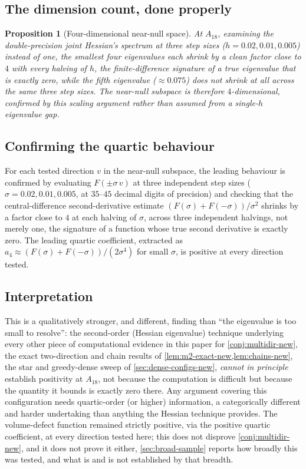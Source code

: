 \documentclass[11pt,reqno]{amsart}
\renewcommand{\_}{\origunderscore\allowbreak}
\numberwithin{equation}{section}
\theoremstyle{plain}
\newtheorem{prop}[thm]{Proposition}
\theoremstyle{definition}
\theoremstyle{remark}
\begin{document}
\subsection{The dimension count, done properly}\label{sec:dim-count-new}

\begin{prop}[Four-dimensional near-null space]\label{prop:4d-nullspace-new}
At $A_{18}$, examining the double-precision joint Hessian's spectrum at
three step sizes ($h=0.02,0.01,0.005$) instead of one, the smallest
four eigenvalues each shrink by a clean factor close to $4$ with every
halving of $h$, the finite-difference signature of a true eigenvalue
that is exactly zero, while the fifth eigenvalue ($\approx0.075$)
does not shrink at all across the same three step sizes. The near-null
subspace is therefore $4$-dimensional, confirmed by this scaling
argument rather than assumed from a single-$h$ eigenvalue gap.
\end{prop}

\subsection{Confirming the quartic behaviour}

For each tested direction $v$ in the near-null subspace, the leading
behaviour is confirmed by evaluating $F(\pm\sigma\,v)$ at three
independent step sizes ($\sigma=0.02,0.01,0.005$, at $35$--$45$ decimal
digits of precision) and checking that the central-difference
second-derivative estimate $(F(\sigma)+F(-\sigma))/\sigma^2$ shrinks by
a factor close to $4$ at each halving of $\sigma$, across three
independent halvings, not merely one, the signature of a function
whose true second derivative is exactly zero. The leading quartic
coefficient, extracted as $a_4\approx(F(\sigma)+F(-\sigma))/(2\sigma^4)$
for small $\sigma$, is positive at every direction tested.

\subsection{Interpretation}

This is a qualitatively stronger, and different, finding than ``the
eigenvalue is too small to resolve'': the second-order (Hessian
eigenvalue) technique underlying every other piece of computational
evidence in this paper for \cref{conj:multidir-new}, the exact
two-direction and chain results of \cref{lem:m2-exact-new,lem:chains-new},
the star and greedy-dense sweep of \cref{sec:dense-configs-new}, 
\emph{cannot in principle} establish positivity at $A_{18}$, not
because the computation is difficult but because the quantity it
bounds is exactly zero there. Any argument covering this configuration
needs quartic-order (or higher) information, a categorically
different and harder undertaking than anything the Hessian technique
provides. The volume-defect function remained strictly positive, via
the positive quartic coefficient, at every direction tested here; this
does not disprove \cref{conj:multidir-new}, and it does not prove it
either, \cref{sec:broad-sample} reports how broadly this was tested,
and what is and is not established by that breadth.
\end{document}
